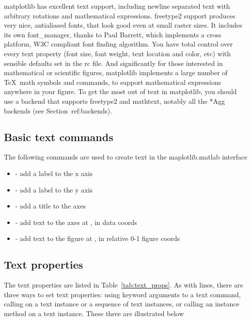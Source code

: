 \documentclass[twoside]{book}
\begin{document}
matplotlib has excellent text support, including newline separated
text with arbitrary rotations and mathematical expressions.  freetype2
support produces very nice, antialiased fonts, that look good even at
small raster sizes.  It includes its own font\_manager, thanks to Paul
Barrett, which implements a cross platform, W3C compliant font finding
algorithm.  You have total control over every text property (font
size, font weight, text location and color, etc) with sensible
defaults set in the rc file.  And significantly for those interested
in mathematical or scientific figures, matplotlib implements a large
number of \TeX\ math symbols and commands, to support mathematical
expressions anywhere in your figure.  To get the most out of text in
matplotlib, you should use a backend that supports freetype2 and
mathtext, notably all the *Agg backends (see Section~{ref:backends}).

\subsection{Basic text commands}
\label{sec:basic_text}

The following commands are used to create text in the maplotlib.matlab
interface

\begin{itemize}
  \item {} - add a label  to the x axis
  \item {} - add a label  to the y axis
  \item {} - add a title  to the axes
  \item {} - add text  to the axes at
    ,  in data coords
  \item {} - add text to the figure at ,
     in relative 0-1 figure coords
\end{itemize}



\subsection{Text properties}
\label{sec:text_props}

The text properties are listed in Table~\ref{tab:text_props}.  As with
lines, there are three ways to set text properties: using keyword
arguments to a text command, calling  on a text instance or
a sequence of text instances, or calling an instance method on a text
instance.  These three are illustrated below
\end{document}
